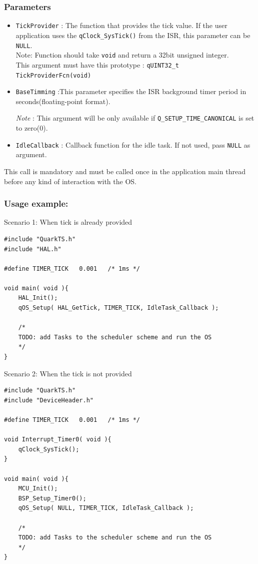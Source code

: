 \documentclass{article}
\begin{document}
\subsubsection*{Parameters}
\begin{itemize}
    \item \lstinline{TickProvider} : The function that provides the tick value. If the user application uses the \lstinline{qClock_SysTick()} from the ISR, this parameter can be \lstinline{NULL}. \\
    Note: Function should take \lstinline{void} and return a 32bit unsigned integer.  \\
    This argument must have this prototype : \lstinline{qUINT32_t TickProviderFcn(void)}
    \item \lstinline{BaseTimming} :This parameter specifies the ISR background timer period in seconds(floating-point format).
    
    \textit{Note} : This argument will be only available if \lstinline{Q_SETUP_TIME_CANONICAL} is set to zero(0).
    \item \lstinline{IdleCallback} : Callback function for the idle task. If not used, pass \lstinline{NULL} as argument.
\end{itemize}


\begin{tcolorbox}
\HandRight This call is mandatory and must be called once in the application main thread before any kind of interaction with the OS.
\end{tcolorbox}

\subsubsection*{Usage example:}
Scenario 1: When tick is already provided
\begin{lstlisting}[style=CStyle]
#include "QuarkTS.h"
#include "HAL.h"

#define TIMER_TICK   0.001   /* 1ms */ 

void main( void ){
    HAL_Init(); 
    qOS_Setup( HAL_GetTick, TIMER_TICK, IdleTask_Callback );
    
    /*
    TODO: add Tasks to the scheduler scheme and run the OS
    */
}
\end{lstlisting}


Scenario 2: When the tick is not provided
\begin{lstlisting}[style=CStyle]
#include "QuarkTS.h"
#include "DeviceHeader.h"

#define TIMER_TICK   0.001   /* 1ms */ 

void Interrupt_Timer0( void ){
    qClock_SysTick();
}

void main( void ){
    MCU_Init();
    BSP_Setup_Timer0(); 
    qOS_Setup( NULL, TIMER_TICK, IdleTask_Callback ); 
    
    /*
    TODO: add Tasks to the scheduler scheme and run the OS
    */
}
\end{lstlisting}
\end{document}
